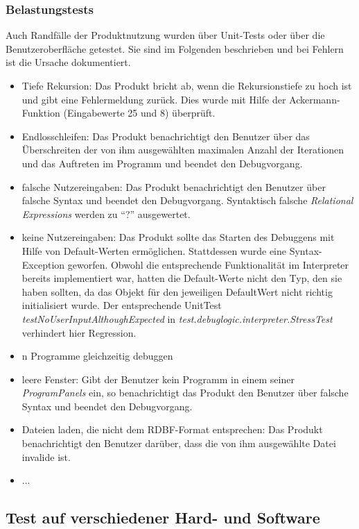 \documentclass[parskip=full]{scrartcl}
\begin{document}
\subsubsection{Belastungstests} %
\label{stress}
Auch Randfälle der Produktnutzung wurden über Unit-Tests oder über die Benutzeroberfläche getestet. Sie sind im Folgenden beschrieben und bei Fehlern ist die Ursache dokumentiert.
\begin{itemize}
\item Tiefe Rekursion: Das Produkt bricht ab, wenn die Rekursionstiefe zu hoch ist und gibt eine Fehlermeldung zurück. Dies wurde mit Hilfe der Ackermann-Funktion (Eingabewerte 25 und 8) überprüft.
\item Endlosschleifen: Das Produkt benachrichtigt den Benutzer über das Überschreiten der von ihm ausgewählten maximalen Anzahl der Iterationen und das Auftreten im Programm und beendet den Debugvorgang.
\item falsche Nutzereingaben: Das Produkt benachrichtigt den Benutzer über falsche Syntax und beendet den Debugvorgang. Syntaktisch falsche \textit{Relational Expressions} werden zu \enquote{?} ausgewertet.
\item keine Nutzereingaben: Das Produkt sollte das Starten des Debuggens mit Hilfe von Default-Werten ermöglichen. Stattdessen wurde eine Syntax-Exception geworfen. Obwohl die entsprechende Funktionalität im Interpreter bereits implementiert war, hatten die Default-Werte nicht den Typ, den sie haben sollten, da das Objekt für den jeweiligen DefaultWert nicht richtig initialisiert wurde.
Der entsprechende UnitTest \textit{testNoUserInputAlthoughExpected} in \textit{test.debuglogic.interpreter.StressTest} verhindert hier Regression.
\item n Programme gleichzeitig debuggen
\item leere Fenster: Gibt der Benutzer kein Programm in einem seiner \textit{ProgramPanels} ein, so benachrichtigt das Produkt den Benutzer über falsche Syntax und beendet den Debugvorgang.
\item Dateien laden, die nicht dem RDBF-Format entsprechen: Das Produkt benachrichtigt den Benutzer darüber, dass die von ihm ausgewählte Datei invalide ist.
\item ...

\end{itemize}

\subsection{Test auf verschiedener Hard- und Software}
\end{document}
